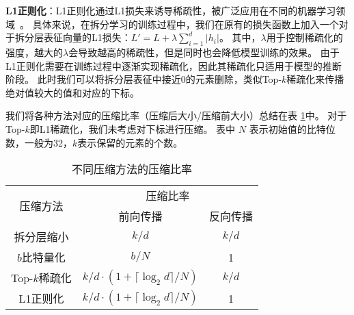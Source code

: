 \textbf{L1正则化}：L1正则化通过L1损失来诱导稀疏性，被广泛应用在不同的机器学习领域~\cite{tibshirani1996lasso,wright2008sparse_face,yin2012kernel,hoefler2021sparse_deeplearning}。
%
具体来说，在拆分学习的训练过程中，我们在原有的损失函数上加入一个对于拆分层表征向量的L1损失：$L' = L + \lambda \sum_{i=1}^d |h_i|$。
%
其中，$\lambda$用于控制稀疏化的强度，越大的$\lambda$会导致越高的稀疏性，但是同时也会降低模型训练的效果。
%
由于L1正则化需要在训练过程中逐渐实现稀疏化，因此其稀疏化只适用于模型的推断阶段。
此时我们可以将拆分层表征中接近0的元素删除，类似Top-$k$稀疏化来传播绝对值较大的值和对应的下标。
%


我们将各种方法对应的压缩比率（压缩后大小/压缩前大小）总结在表 \ref{tab:randomized_top-k:compression_ratio}中。
%
对于Top-$k$即L1稀疏化，我们未考虑对下标进行压缩。
%
表中 $N$ 表示初始值的比特位数，一般为32，$k$表示保留的元素的个数。

\begin{table}[h]
    \centering
    \begin{tabular}{ccc}
    \toprule
    \multirow{2}{*}{压缩方法} & \multicolumn{2}{c}{压缩比率} \\ 
    \cmidrule(lr){2-3}
            & 前向传播 & 反向传播 \\ \midrule
    拆分层缩小     & $k/d$       & $k/d$ \\
    $b$比特量化    & $b/N$    & 1 \\
    Top-$k$稀疏化  & $k/d\cdot (1 + \lceil \log_2 d \rceil/N)$ & $k/d$ \\
    L1正则化       & $k/d\cdot (1 + \lceil \log_2 d \rceil/N)$ & 1 \\
    \bottomrule
    \end{tabular}
    \caption{不同压缩方法的压缩比率}
    \label{tab:randomized_top-k:compression_ratio}
\end{table}